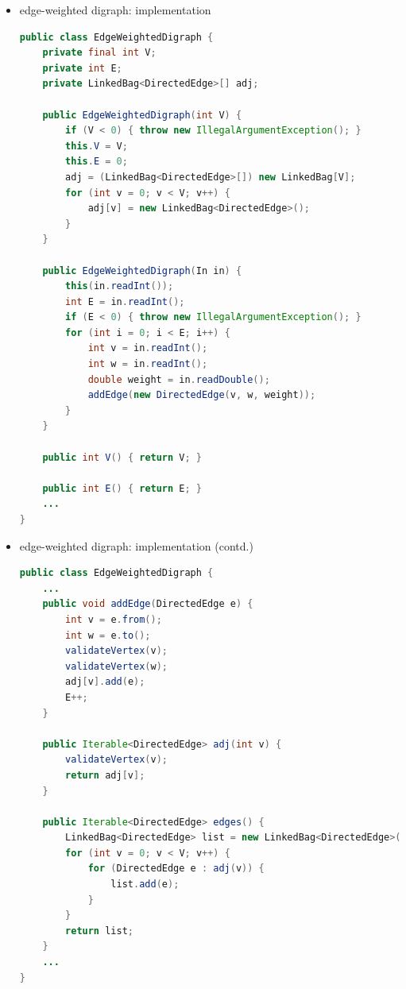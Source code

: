 \documentclass[8pt,a4paper,compress]{beamer}
\begin{document}
\begin{frame}[fragile]
\begin{itemize}
\item edge-weighted digraph: implementation
\begin{lstlisting}[language=Java]
public class EdgeWeightedDigraph {
    private final int V;
    private int E;
    private LinkedBag<DirectedEdge>[] adj;
    
    public EdgeWeightedDigraph(int V) {
        if (V < 0) { throw new IllegalArgumentException(); }
        this.V = V;
        this.E = 0;
        adj = (LinkedBag<DirectedEdge>[]) new LinkedBag[V];
        for (int v = 0; v < V; v++) {
            adj[v] = new LinkedBag<DirectedEdge>();
        }
    }

    public EdgeWeightedDigraph(In in) {
        this(in.readInt());
        int E = in.readInt();
        if (E < 0) { throw new IllegalArgumentException(); }
        for (int i = 0; i < E; i++) {
            int v = in.readInt();
            int w = in.readInt();
            double weight = in.readDouble();
            addEdge(new DirectedEdge(v, w, weight));
        }
    }
    
    public int V() { return V; }

    public int E() { return E; }
    ...
}
\end{lstlisting}
\end{itemize}
\end{frame}

\begin{frame}[fragile]
\begin{itemize}
\item edge-weighted digraph: implementation (contd.)
\begin{lstlisting}[language=Java]
public class EdgeWeightedDigraph {
    ...
    public void addEdge(DirectedEdge e) {
        int v = e.from();
        int w = e.to();
        validateVertex(v);
        validateVertex(w);
        adj[v].add(e);
        E++;
    }

    public Iterable<DirectedEdge> adj(int v) {
        validateVertex(v);
        return adj[v];
    }

    public Iterable<DirectedEdge> edges() {
        LinkedBag<DirectedEdge> list = new LinkedBag<DirectedEdge>();
        for (int v = 0; v < V; v++) {
            for (DirectedEdge e : adj(v)) {
                list.add(e);
            }
        }
        return list;
    } 
    ...
}
\end{lstlisting}
\end{itemize}
\end{frame}
\end{document}
